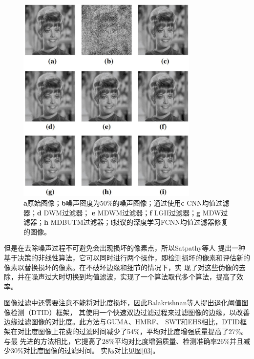 \begin{figure}[htbp]
	\begin{center}
	    \vspace{10pt} %
		\includegraphics[width = 0.8\textwidth]{images/07.eps}
		\caption{\textbf{a}原始图像；\textbf{b}噪声密度为50\%的噪声图像；通过使用\textbf{c} CNN均值过滤器；\textbf{d} DWM过滤器；
		\textbf{e} MDWM过滤器；\textbf{f} LGII过滤器；\textbf{g} MDW过滤器；\textbf{h} MDBUTM过滤器；\textbf{i}拟议的深度学习FCNN均值过滤器修复的图像。} 
		\label{07} %
	\end{center}
\end{figure}


但是在去除噪声过程不可避免会出现损坏的像素点，所以Satpathy等人\cite{satpathyAdaptiveNonlinearFiltering2022}
提出一种基于决策的非线性算法，它可以同时进行两个操作，即检测损坏的像素和评估新的像素以替换损坏的像素。在不破坏边缘和细节的情况下，实
现了对这些伪像的去除，并在噪声过大时切换到均值滤波，实现了一个算法取代多个算法，提高了效率。

图像过滤中还需要注意不能将对比度损坏，因此Balakrishnan等人\cite{natarajanContrastEnhancementBased2022}提出退化阈值图像检测（DTID）框架，
其使用一个快速双边过滤过程来过滤图像的边缘，以改善边缘过滤图像的对比度。此方法与GUMA、HMRF、
SWT和EHS相比，DTID框架在对比度图像上花费的过滤时间减少了54\%，平均对比度增强质量提高了27\%。与最
先进的方法相比，它提高了28\%平均对比度增强质量、检测准确率26\%并且减少30\%对比度图像的过滤时间。
实际对比见图\ref{03}。

